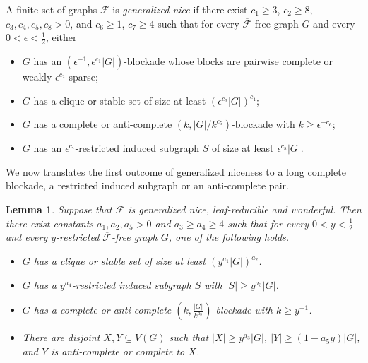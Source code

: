 \documentclass[a4paper,11pt]{article}
\newtheorem{lemma}[theorem]{Lemma}
\begin{document}
    A finite set of graphs $\mathcal{F}$ is {\em generalized nice} if there exist $c_1\geq 3$, $c_2\geq 8$, $c_3,c_4,c_5,c_8>0$, and $c_6\geq 1$, $c_7\geq 4$ such that for every $\overline{\mathcal{F}}$-free graph $G$ and every $0<\epsilon<\frac{1}{2}$, either  
        \begin{itemize}
            \item $G$ has an $(\epsilon^{-1},  \epsilon^{c_1}|G|)$-blockade whose blocks are pairwise complete or weakly $\epsilon^{c_2}$-sparse; 

            \item $G$ has a clique or stable set of size at least $(\epsilon^{c_3}|G|)^{c_4}$;

            \item $G$ has a complete or anti-complete $(k,|G|/k^{c_5})$-blockade with $k\geq \epsilon^{-c_6}$; 

            \item $G$ has an $\epsilon^{c_7}$-restricted induced subgraph $S$ of size at least $\epsilon^{c_8}|G|$.  
        \end{itemize}
    

    
    
    We now translates the first outcome of generalized niceness to a long complete blockade, a restricted induced subgraph or an anti-complete pair. 
    
    \begin{lemma}\label{lem:main-E-graph-structure}
        Suppose that $\mathcal{F}$ is generalized nice, leaf-reducible and wonderful. 
        Then there exist constants $a_1,a_2,a_5>0$ and $a_3\geq a_4\geq 4$ such that for every $0<y<\frac{1}{2}$ and every $y$-restricted $\overline{\mathcal{F}}$-free graph $G$, one of the following holds.
        \begin{itemize}
            \item[$(1)$] $G$ has a clique or stable set of size at least $(y^{a_1}|G|)^{a_2}$. 

            \item[$(2)$] $G$ has a $y^{a_4}$-restricted induced subgraph $S$ with $|S|\geq y^{a_3}|G|$.

            \item[$(3)$] $G$ has a complete or anti-complete $(k,\frac{|G|}{k^{a_3}})$-blockade with $k\geq y^{-1}$.

            \item[$(4)$] There are disjoint $X,Y\subseteq V(G)$ such that $|X|\geq y^{a_3}|G|$, $|Y|\geq (1-a_5y)|G|$, and $Y$ is anti-complete or complete to $X$. 
            
        \end{itemize}
    \end{lemma}
    
\end{document}
